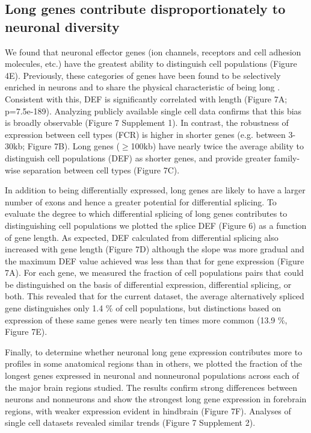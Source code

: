 \subsection{Long genes contribute disproportionately to neuronal diversity}

We found that neuronal effector genes (ion channels, receptors and cell adhesion molecules, etc.) have the greatest ability to distinguish cell populations (Figure 4E). Previously, these categories of genes have been found to be selectively enriched in neurons and to share the physical characteristic of being long \citep{Sugino_2014,Gabel_2015,Zylka_2015}. Consistent with this, DEF is significantly correlated with length (Figure 7A; p=7.5e-189). Analyzing publicly available single cell data confirms that this bias is broadly observable (Figure 7 Supplement 1). In contrast, the robustness of expression between cell types (FCR) is higher in shorter genes (e.g. between 3-30kb; Figure 7B). Long genes ($\geq$100kb) have nearly twice the average ability to distinguish cell populations (DEF) as shorter genes, and provide greater family-wise separation between cell types (Figure 7C).  

In addition to being differentially expressed, long genes are likely to have a larger number of exons and hence a greater potential for differential splicing. To evaluate the degree to which differential splicing of long genes contributes to distinguishing cell populations we plotted the splice DEF (Figure 6) as a function of gene length. As expected, DEF calculated from differential splicing also increased with gene length (Figure 7D) although the slope was more gradual and the maximum DEF value achieved was less than that for gene expression (Figure 7A). For each gene, we measured the fraction of cell populations pairs that could be distinguished on the basis of differential expression, differential splicing, or both. This revealed that for the current dataset, the average alternatively spliced gene distinguishes only 1.4 \% of cell populations, but distinctions based on expression of these same genes were nearly ten times more common (13.9 \%, Figure 7E). 

Finally, to determine whether neuronal long gene expression contributes more to profiles in some anatomical regions than in others, we plotted the fraction of the longest genes expressed in neuronal and nonneuronal populations across each of the major brain regions studied. The results confirm strong differences between neurons and nonneurons and show the strongest long gene expression in forebrain regions, with weaker expression evident in hindbrain (Figure 7F). Analyses of single cell datasets revealed similar trends (Figure 7 Supplement 2). 


